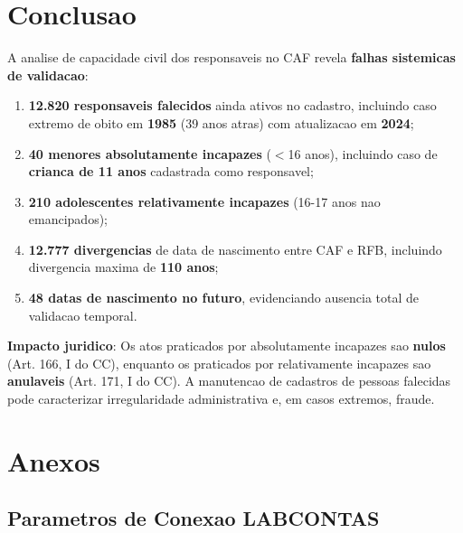 \documentclass[11pt,a4paper]{article}
\begin{document}
\section{Conclusao}

A analise de capacidade civil dos responsaveis no CAF revela \textbf{falhas sistemicas
de validacao}:

\begin{enumerate}
    \item \textbf{12.820 responsaveis falecidos} ainda ativos no cadastro, incluindo
    caso extremo de obito em \textbf{1985} (39 anos atras) com atualizacao em \textbf{2024};

    \item \textbf{40 menores absolutamente incapazes} ($<$16 anos), incluindo caso de
    \textbf{crianca de 11 anos} cadastrada como responsavel;

    \item \textbf{210 adolescentes relativamente incapazes} (16-17 anos nao emancipados);

    \item \textbf{12.777 divergencias} de data de nascimento entre CAF e RFB, incluindo
    divergencia maxima de \textbf{110 anos};

    \item \textbf{48 datas de nascimento no futuro}, evidenciando ausencia total de
    validacao temporal.
\end{enumerate}

\textbf{Impacto juridico}: Os atos praticados por absolutamente incapazes sao \textbf{nulos}
(Art. 166, I do CC), enquanto os praticados por relativamente incapazes sao \textbf{anulaveis}
(Art. 171, I do CC). A manutencao de cadastros de pessoas falecidas pode caracterizar
irregularidade administrativa e, em casos extremos, fraude.

\section{Anexos}

\subsection{Parametros de Conexao LABCONTAS}
\end{document}
